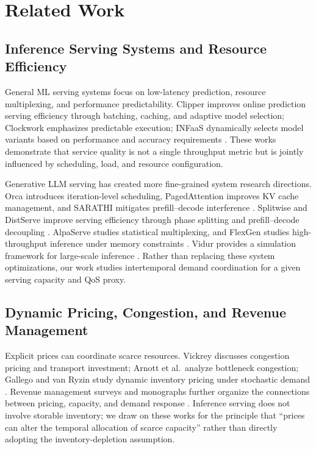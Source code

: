 \documentclass[11pt]{article}
\begin{document}
\section{Related Work}
\label{sec:related_work}

\subsection{Inference Serving Systems and Resource Efficiency}

General ML serving systems focus on low-latency prediction, resource
multiplexing, and performance predictability. Clipper improves online
prediction serving efficiency through batching, caching, and adaptive model
selection; Clockwork emphasizes predictable execution; INFaaS dynamically
selects model variants based on performance and accuracy requirements
\cite{crankshaw2017clipper,gujarati2020clockwork,romero2021infaas}.
These works demonstrate that service quality is not a single throughput
metric but is jointly influenced by scheduling, load, and resource
configuration.

Generative LLM serving has created more fine-grained system research
directions. Orca introduces iteration-level scheduling, PagedAttention
improves KV cache management, and SARATHI mitigates prefill--decode
interference \cite{yu2022orca,kwon2023pagedattention,agrawal2024sarathiserve}.
Splitwise and DistServe improve serving efficiency through phase splitting
and prefill--decode decoupling \cite{patel2024splitwise,zhong2024distserve}.
AlpaServe studies statistical multiplexing, and FlexGen studies
high-throughput inference under memory constraints
\cite{li2023alpaserve,sheng2023flexgen}. Vidur provides a simulation
framework for large-scale inference \cite{agrawal2024vidur}. Rather than
replacing these system optimizations, our work studies intertemporal demand
coordination for a given serving capacity and QoS proxy.

\subsection{Dynamic Pricing, Congestion, and Revenue Management}

Explicit prices can coordinate scarce resources. Vickrey discusses
congestion pricing and transport investment; Arnott et al.\ analyze
bottleneck congestion; Gallego and van Ryzin study dynamic inventory
pricing under stochastic demand
\cite{vickrey1969congestion,arnott1990bottleneck,gallego1994dynamic}.
Revenue management surveys and monographs further organize the connections
between pricing, capacity, and demand response
\cite{elmaghraby2003dynamic,bitran2003overview,talluri2004revenue,
phillips2005pricing}.
Inference serving does not involve storable inventory; we draw on these
works for the principle that ``prices can alter the temporal allocation of
scarce capacity'' rather than directly adopting the inventory-depletion
assumption.
\end{document}
